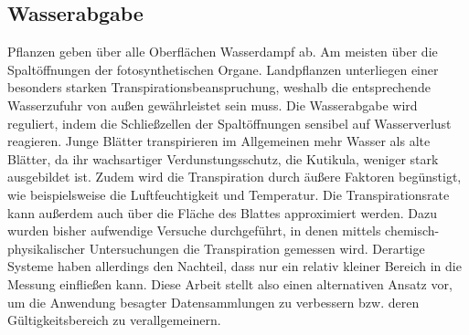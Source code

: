 \subsection{Wasserabgabe}
Pflanzen geben über alle Oberflächen Wasserdampf ab. Am meisten über die Spaltöffnungen der fotosynthetischen Organe. Landpflanzen unterliegen einer besonders starken Transpirationsbeanspruchung, weshalb die entsprechende Wasserzufuhr von außen gewährleistet sein muss. Die Wasserabgabe wird reguliert, indem die Schließzellen der Spaltöffnungen sensibel auf Wasserverlust reagieren. Junge Blätter transpirieren im Allgemeinen mehr Wasser als alte Blätter, da ihr wachsartiger Verdunstungsschutz, die Kutikula, weniger stark ausgebildet ist. Zudem wird die Transpiration durch äußere Faktoren begünstigt, wie beispielsweise die Luftfeuchtigkeit und Temperatur. Die Transpirationsrate kann außerdem auch über die Fläche des Blattes approximiert werden. Dazu wurden bisher aufwendige Versuche durchgeführt, in denen mittels chemisch-physikalischer Untersuchungen die Transpiration gemessen wird. Derartige Systeme haben allerdings den Nachteil, dass nur ein relativ kleiner Bereich in die Messung einfließen kann. Diese Arbeit stellt also einen alternativen Ansatz vor, um die Anwendung besagter Datensammlungen zu verbessern bzw. deren Gültigkeitsbereich zu verallgemeinern.
\newpage

